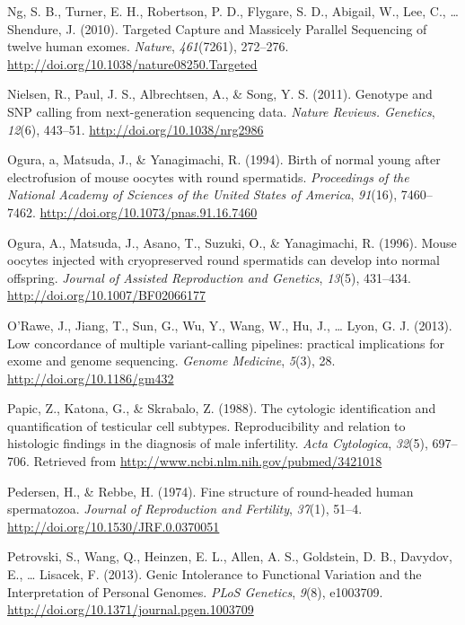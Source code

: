 \documentclass[12pt,twoside]{reedthesis}
\theoremstyle{definition}
\theoremstyle{definition}
\theoremstyle{remark}
\begin{document}
  \hypertarget{ref-Ng2010}{}
  Ng, S. B., Turner, E. H., Robertson, P. D., Flygare, S. D., Abigail, W.,
  Lee, C., \ldots{} Shendure, J. (2010). Targeted Capture and Massicely
  Parallel Sequencing of twelve human exomes. \emph{Nature},
  \emph{461}(7261), 272--276.
  \url{http://doi.org/10.1038/nature08250.Targeted}
  
  \hypertarget{ref-Nielsen2011}{}
  Nielsen, R., Paul, J. S., Albrechtsen, A., \& Song, Y. S. (2011).
  Genotype and SNP calling from next-generation sequencing data.
  \emph{Nature Reviews. Genetics}, \emph{12}(6), 443--51.
  \url{http://doi.org/10.1038/nrg2986}
  
  \hypertarget{ref-Ogura1994}{}
  Ogura, a, Matsuda, J., \& Yanagimachi, R. (1994). Birth of normal young
  after electrofusion of mouse oocytes with round spermatids.
  \emph{Proceedings of the National Academy of Sciences of the United
  States of America}, \emph{91}(16), 7460--7462.
  \url{http://doi.org/10.1073/pnas.91.16.7460}
  
  \hypertarget{ref-Kimura1995}{}
  Ogura, A., Matsuda, J., Asano, T., Suzuki, O., \& Yanagimachi, R.
  (1996). Mouse oocytes injected with cryopreserved round spermatids can
  develop into normal offspring. \emph{Journal of Assisted Reproduction
  and Genetics}, \emph{13}(5), 431--434.
  \url{http://doi.org/10.1007/BF02066177}
  
  \hypertarget{ref-ORawe2013}{}
  O'Rawe, J., Jiang, T., Sun, G., Wu, Y., Wang, W., Hu, J., \ldots{} Lyon,
  G. J. (2013). Low concordance of multiple variant-calling pipelines:
  practical implications for exome and genome sequencing. \emph{Genome
  Medicine}, \emph{5}(3), 28. \url{http://doi.org/10.1186/gm432}
  
  \hypertarget{ref-Papic}{}
  Papic, Z., Katona, G., \& Skrabalo, Z. (1988). The cytologic
  identification and quantification of testicular cell subtypes.
  Reproducibility and relation to histologic findings in the diagnosis of
  male infertility. \emph{Acta Cytologica}, \emph{32}(5), 697--706.
  Retrieved from \url{http://www.ncbi.nlm.nih.gov/pubmed/3421018}
  
  \hypertarget{ref-Pedersen1974}{}
  Pedersen, H., \& Rebbe, H. (1974). Fine structure of round-headed human
  spermatozoa. \emph{Journal of Reproduction and Fertility}, \emph{37}(1),
  51--4. \url{http://doi.org/10.1530/JRF.0.0370051}
  
  \hypertarget{ref-Petrovski2013}{}
  Petrovski, S., Wang, Q., Heinzen, E. L., Allen, A. S., Goldstein, D. B.,
  Davydov, E., \ldots{} Lisacek, F. (2013). Genic Intolerance to
  Functional Variation and the Interpretation of Personal Genomes.
  \emph{PLoS Genetics}, \emph{9}(8), e1003709.
  \url{http://doi.org/10.1371/journal.pgen.1003709}
  
\end{document}
